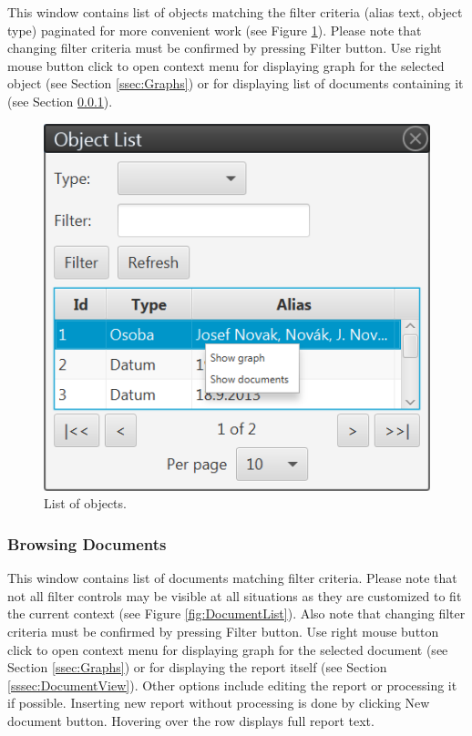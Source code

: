 This window contains list of objects matching the filter criteria (alias text,
object type) paginated for more convenient work (see Figure
\ref{fig:ObjectList}). Please note that changing filter criteria must be confirmed by pressing Filter button. Use right mouse button click to open context menu for displaying graph for the selected object (see Section \ref{ssec:Graphs}) or for displaying list of documents containing it (see
Section \ref{sssec:DocumentList}).

\begin{figure}[!htb]
        \centering
        \includegraphics{Images/objectlist}
        \caption{List of objects.}
        \label{fig:ObjectList}
\end{figure}

\subsubsection{Browsing Documents}
\label{sssec:DocumentList}

This window contains list of documents matching filter criteria. Please note
that not all filter controls may be visible at all situations as they are
customized to fit the current context (see Figure \ref{fig:DocumentList}).
Also note that changing filter criteria must be confirmed by pressing Filter
button. Use right mouse button click to open context menu for displaying graph
for the selected document (see Section \ref{ssec:Graphs}) or for displaying the
report itself (see Section \ref{sssec:DocumentView}). Other options include
editing the report or processing it if possible. Inserting new report without processing is done by clicking New document button. Hovering over the row displays full report text.

